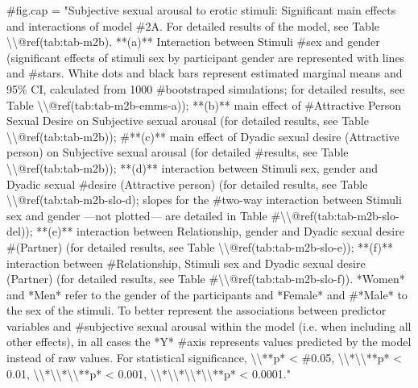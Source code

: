 \documentclass[
  bookmarksnumbered]{article}
\newenvironment{Shaded}{\begin{snugshade}}{\end{snugshade}}
\newcommand{\CommentTok}[1]{\textcolor[rgb]{0.50,0.62,0.50}{#1}}
\begin{document}
\begin{Shaded}
\begin{Highlighting}[]
\CommentTok{\#fig.cap = "Subjective sexual arousal to erotic stimuli: Significant main effects and interactions of model \#2A. For detailed results of the model, see Table \textbackslash{}\textbackslash{}@ref(tab:tab{-}m2b). **(a)** Interaction between Stimuli \#sex and gender (significant effects of stimuli sex by participant gender are represented with lines and \#stars. White dots and black bars represent estimated marginal means and 95\% CI, calculated from 1000 \#bootstraped simulations; for detailed results, see Table \textbackslash{}\textbackslash{}@ref(tab:tab{-}m2b{-}emms{-}a)); **(b)** main effect of \#Attractive Person Sexual Desire on Subjective sexual arousal (for detailed results, see Table \textbackslash{}\textbackslash{}@ref(tab:tab{-}m2b)); \#**(c)** main effect of Dyadic sexual desire (Attractive person) on Subjective sexual arousal  (for detailed \#results, see Table \textbackslash{}\textbackslash{}@ref(tab:tab{-}m2b)); **(d)** interaction between Stimuli sex, gender and Dyadic sexual \#desire (Attractive person) (for detailed results, see Table \textbackslash{}\textbackslash{}@ref(tab:tab{-}m2b{-}slo{-}d); slopes for the \#two{-}way interaction between Stimuli sex and gender —not plotted— are detailed in Table \#\textbackslash{}\textbackslash{}@ref(tab:tab{-}m2b{-}slo{-}del)); **(e)** interaction between Relationship, gender and Dyadic sexual desire \#(Partner) (for detailed results, see Table \textbackslash{}\textbackslash{}@ref(tab:tab{-}m2b{-}slo{-}e)); **(f)** interaction between \#Relationship, Stimuli sex and Dyadic sexual desire (Partner) (for detailed results, see Table \#\textbackslash{}\textbackslash{}@ref(tab:tab{-}m2b{-}slo{-}f)). *Women* and *Men* refer to the gender of the participants and *Female* and \#*Male* to the sex of the stimuli. To better represent the associations between predictor variables and \#subjective sexual arousal within the model (i.e. when including all other effects), in all cases the *Y* \#axis represents values predicted by the model instead of raw values. For statistical significance, \textbackslash{}\textbackslash{}**p* \textless{} \#0.05, \textbackslash{}\textbackslash{}*\textbackslash{}\textbackslash{}**p* \textless{} 0.01, \textbackslash{}\textbackslash{}*\textbackslash{}\textbackslash{}*\textbackslash{}\textbackslash{}**p* \textless{} 0.001, \textbackslash{}\textbackslash{}*\textbackslash{}\textbackslash{}*\textbackslash{}\textbackslash{}*\textbackslash{}\textbackslash{}**p* \textless{} 0.0001."}



\end{Highlighting}
\end{Shaded}
\end{document}
